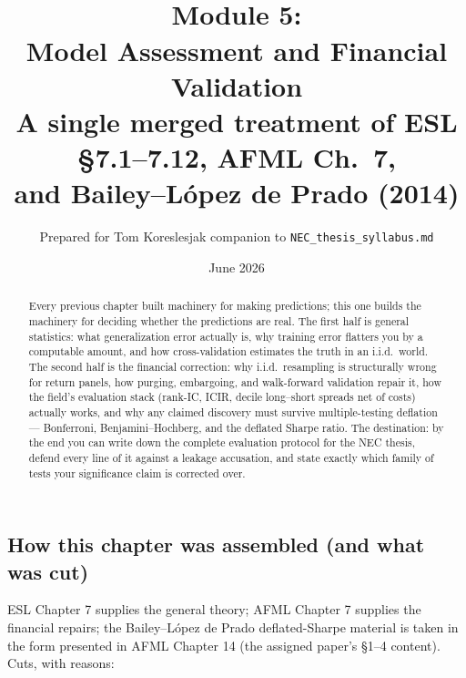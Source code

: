 \documentclass[11pt]{article}
\title{\vspace{-1.2em}{\large\sffamily Foundations for a Quant Research Pipeline}\\[0.4em]
\textbf{Module 5:\\ Model Assessment and Financial Validation}\\[0.3em]
{\large A single merged treatment of ESL \S7.1--7.12, AFML Ch.\ 7,\\ and Bailey--L\'opez de Prado (2014)}}
\author{Prepared for Tom Koreslesjak \;\textperiodcentered\; companion to \texttt{NEC\_thesis\_syllabus.md}}
\date{June 2026}
\numberwithin{equation}{section}
\theoremstyle{plain}
\theoremstyle{definition}
\theoremstyle{remark}
\begin{document}
\maketitle
\vspace{-1.5em}

\begin{abstract}
\noindent Every previous chapter built machinery for making predictions; this one builds the machinery for deciding whether the predictions are real. The first half is general statistics: what generalization error actually is, why training error flatters you by a computable amount, and how cross-validation estimates the truth in an i.i.d.\ world. The second half is the financial correction: why i.i.d.\ resampling is structurally wrong for return panels, how purging, embargoing, and walk-forward validation repair it, how the field's evaluation stack (rank-IC, ICIR, decile long--short spreads net of costs) actually works, and why any claimed discovery must survive multiple-testing deflation --- Bonferroni, Benjamini--Hochberg, and the deflated Sharpe ratio. The destination: by the end you can write down the complete evaluation protocol for the NEC thesis, defend every line of it against a leakage accusation, and state exactly which family of tests your significance claim is corrected over.
\end{abstract}

\tableofcontents

\subsection*{How this chapter was assembled (and what was cut)}

ESL Chapter 7 supplies the general theory; AFML Chapter 7 supplies the financial repairs; the Bailey--L\'opez de Prado deflated-Sharpe material is taken in the form presented in AFML Chapter 14 (the assigned paper's \S1--4 content). Cuts, with reasons:
\end{document}
